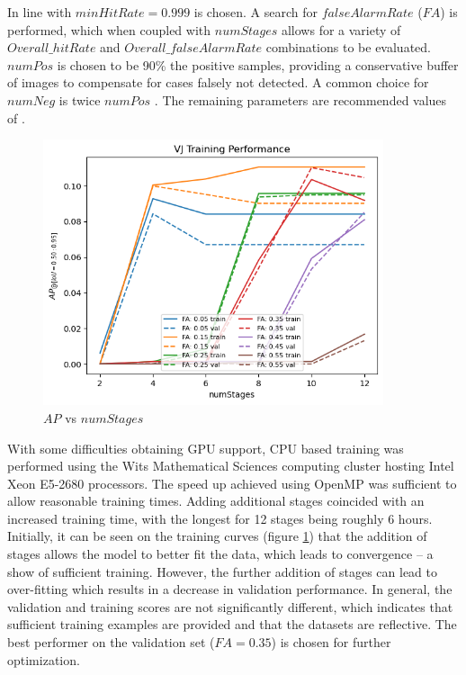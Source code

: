 \documentclass[a4paper,twoside,12pt]{report}
\begin{document}
In line with \cite{robovj} $minHitRate = 0.999$ is chosen. A search for $falseAlarmRate$ ($FA$) is performed, which when coupled with $numStages$ allows for a variety of $Overall\_hitRate$ and $Overall\_falseAlarmRate$ combinations to be evaluated. $numPos$ is chosen to be 90\% the positive samples, providing a conservative buffer of images to compensate for cases falsely not detected. A common choice for $numNeg$ is twice $numPos$ \citep{numneg}. The remaining parameters are recommended values of \cite{vjdataset}.

\begin{figure}[h!]
\begin{center}
\includegraphics[width=10cm]{images/vj_training.png}
\caption{$AP$ vs $numStages$}
\label{fig:vjstages}
\end{center}
\end{figure}

With some difficulties obtaining GPU support, CPU based training was performed using the Wits Mathematical Sciences computing cluster hosting Intel Xeon E5-2680 processors. The speed up achieved using OpenMP was sufficient to allow reasonable training times. Adding additional stages coincided with an increased training time, with the longest for 12 stages being roughly 6 hours. Initially, it can be seen on the training curves (figure \ref{fig:vjstages}) that the addition of stages allows the model to better fit the data, which leads to convergence -- a show of sufficient training. However, the further addition of stages can lead to over-fitting which results in a decrease in validation performance. In general, the validation and training scores are not significantly different, which indicates that sufficient training examples are provided and that the datasets are reflective. The best performer on the validation set ($FA=0.35$) is chosen for further optimization.
\end{document}
